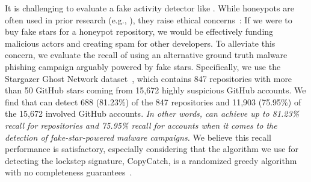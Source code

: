 It is challenging to evaluate a fake activity detector like \SystemName.
While honeypots are often used in prior research (e.g., \cite{DBLP:conf/acsac/DuYZDWH0020, DBLP:conf/imc/CristofaroFJKS14, DBLP:journals/dss/CresciPPST15}), they raise ethical concerns~\cite{DBLP:conf/icissp/WeipplSR16, DBLP:conf/uss/KohnoAL23}: If we were to buy fake stars for a honeypot repository, we would be effectively funding malicious actors and creating spam for other developers.
To alleviate this concern, we evaluate the recall of \SystemName using an alternative ground truth malware phishing campaign arguably powered by fake stars.
Specifically, we use the Stargazer Ghost Network dataset~\cite{stargazer-goblin}, which contains 847 repositories with more than 50 GitHub stars coming from 15,672 highly suspicious GitHub accounts. %
We find that \SystemName can detect 688 (81.23\%) of the 847 repositories and 11,903 (75.95\%) of the 15,672 involved GitHub accounts.
\emph{In other words, \SystemName can achieve up to 81.23\% recall for repositories and 75.95\% recall for accounts when it comes to the detection of fake-star-powered malware campaigns.}
We believe this recall performance is satisfactory, especially considering that the algorithm we use for detecting the lockstep signature, \textsf{CopyCatch}, is a randomized greedy algorithm with no completeness guarantees~\cite{DBLP:conf/www/BeutelXGPF13}.

